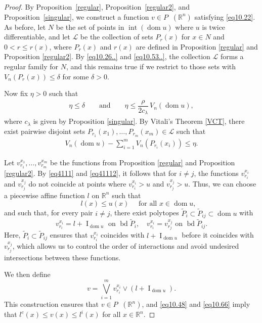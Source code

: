 \documentclass[11pt]{article}
\theoremstyle{definition} %
\newcommand{\RR}{(\mathbb{R}^n)}
\DeclareMathOperator{\I}{I}
\DeclareMathOperator{\LQ}{_{l.q}}
\DeclareMathOperator{\dom}{dom}
\DeclareMathOperator{\interior}{int}
\DeclareMathOperator{\bd}{bd}
\begin{document}
\begin{proof}
By Proposition~\ref{regular}, Proposition~\ref{regular2}, and Proposition~\ref{singular}, we construct a function
$v\in P\LQ\RR$ satisfying \eqref{eq10.22}. As before, let $N$ be the set of  points in $\interior(\dom u)$ where $u$ is twice differentiable,  and let $\mathcal{L}$ be the collection of sets  $P_r(x)$
for $x\in N$ and $0<r\leq r(x)$, where $P_r(x)$ and $r(x)$ are defined in  Proposition \ref{regular} and Proposition \ref{regular2}.  By \eqref{eq10.26..} and \eqref{eq10.53..}, the collection $\mathcal{L}$ forms a regular family for $N$, and this remains true if we restrict to those sets with  $V_n(P_r(x))\leq \delta$  for some $\delta>0$. 


Now fix $\eta>0$ such that
\begin{align*}
\eta \leq \delta \qquad \mbox{and} \qquad     \eta\leq \dfrac{\rho}{2c_{\lambda}} \,V_n(\dom u),
\end{align*}
where $c_{\lambda}$ is given by Proposition \ref{singular}. 
By Vitali's Theorem \ref{VCT}, there exist pairwise disjoint sets $P_{r_1}(x_1), \dots, P_{r_m}(x_m)\in\mathcal{L}$ such that
\begin{align*}
    V_n(\dom u)-\sum_{i=1}^m V_n(P_{r_i}(x_i))\leq \eta.  
\end{align*}


Let  $v_{r_1}^{x_1}, \dots, v_{r_m}^{x_m}$ be the functions from  Proposition \ref{regular} and Proposition \ref{regular2}.  By \eqref{eq4111} and \eqref{eq41112}, it follows that for $i\neq j$, the functions $v_{r_i}^{x_i}$ and $v_{r_j}^{x_j}$ do not coincide at points where
$v_{r_i}^{x_i}> u$ and $v_{r_j}^{x_j}> u$.
Thus, we can choose a piecewise affine function $l$ on $\mathbb{R}^n$ such that
$$ \qquad l(x)\leq u(x) \quad \mbox{ for all }  x\in\dom u,$$
and such that, for every pair $i \neq j$, there exist polytopes $\tilde{P}_{i} \subset \tilde{P}_{ij} \subset \dom u$ with 
$$
v_{r_i}^{x_i} = l + \I_{\dom u} \text{ on } \bd \tilde{P}_{i}, \quad 
v_{r_i}^{x_i} = v_{r_j}^{x_j} \text{ on } \bd \tilde{P}_{ij}.
$$
Here, $\tilde{P}_i \subset \tilde{P}_{ij}$ ensures that $v_{r_i}^{x_i}$ coincides with $l + \I_{\dom u}$  before it coincides with $v_{r_j}^{x_j}$, which allows us to control the order of interactions and avoid undesired intersections between these functions.

We then define 
$$v= \bigvee_{i=1}^m v_{r_i}^{x_i}\vee (l+\I_{\dom u}).$$
This construction ensures that $v\in P\LQ\RR$, and   \eqref{eq10.48} and \eqref{eq10.66} imply that $ l^c(x) \leq v(x) \leq l^i(x)$ for all $x \in \mathbb{R}^n$.



\end{proof}
\end{document}
